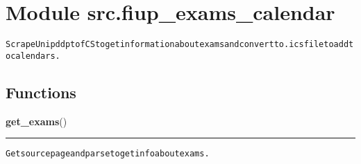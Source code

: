 %
%
%


\section{Module src.fiup\_exams\_calendar}

    \label{src:fiup_exams_calendar}
\begin{alltt}
Scrape Unipd dpt of CS to get information about exams and convert to .ics file to add to calendars. 
\end{alltt}



  \subsection{Functions}

    \label{src:fiup_exams_calendar:get_exams}

    \vspace{0.5ex}

\hspace{.8\funcindent}\begin{boxedminipage}{\funcwidth}

    \raggedright \textbf{get\_exams}()

    \vspace{-1.5ex}

    \rule{\textwidth}{0.5\fboxrule}
\setlength{\parskip}{2ex}
\begin{alltt}
Get source page and parse to get info about exams. 
\end{alltt}

\setlength{\parskip}{1ex}
    \end{boxedminipage}

